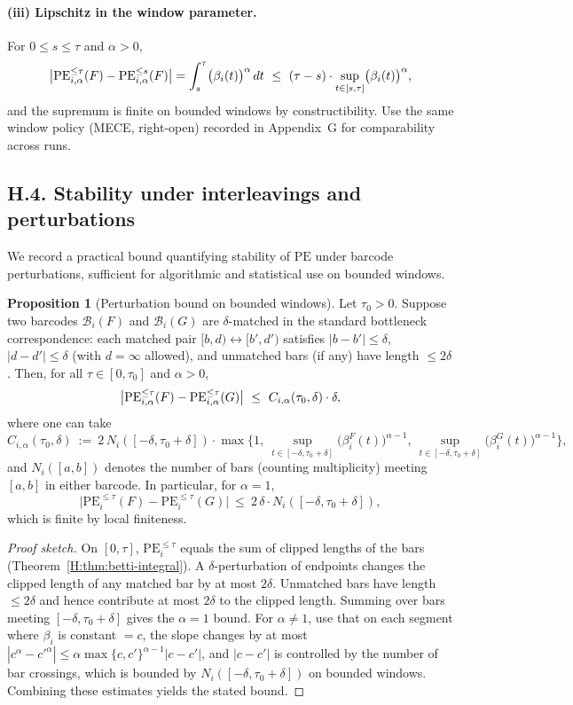 \documentclass[11pt]{article}
\numberwithin{equation}{section}
\theoremstyle{plain}
\theoremstyle{definition}
\theoremstyle{remark}
\theoremstyle{plain}
\theoremstyle{definition}
\numberwithin{equation}{section}
\newtheorem{proposition}[theorem]{Proposition}
\theoremstyle{definition}
\numberwithin{equation}{section}
\theoremstyle{plain}
\theoremstyle{definition}
\theoremstyle{remark}
\providecommand{\n}{\unskip\space}
\begin{document}
\paragraph{(iii) Lipschitz in the window parameter.}
For $0\le s\le \tau$ and $\alpha>0$,
\[
\bigl|\mathrm{PE}_{i,\alpha}^{\le \tau}(F)-\mathrm{PE}_{i,\alpha}^{\le s}(F)\bigr|\n=\int_{s}^{\tau}\bigl(\beta_i(t)\bigr)^{\alpha}\,dt\n\ \le\ (\tau-s)\cdot \sup_{t\in[s,\tau]}\bigl(\beta_i(t)\bigr)^{\alpha},
\]
and the supremum is finite on bounded windows by constructibility. Use the same window policy (MECE, right-open) recorded in Appendix~G for comparability across runs.

\subsection*{H.4. Stability under interleavings and perturbations}
We record a practical bound quantifying stability of $\mathrm{PE}$ under barcode perturbations, sufficient for algorithmic and statistical use on bounded windows.

\begin{proposition}[Perturbation bound on bounded windows]\label{H:prop:bounded-stability}
Let $\tau_0>0$. Suppose two barcodes $\mathcal{B}_i(F)$ and $\mathcal{B}_i(G)$ are $\delta$-matched in the standard bottleneck correspondence: each matched pair $[b,d)\leftrightarrow[b',d')$ satisfies $|b-b'|\le\delta$, $|d-d'|\le\delta$ (with $d=\infty$ allowed), and unmatched bars (if any) have length $\le 2\delta$. Then, for all $\tau\in[0,\tau_0]$ and $\alpha>0$,
\[
\bigl|\mathrm{PE}_{i,\alpha}^{\le \tau}(F)-\mathrm{PE}_{i,\alpha}^{\le \tau}(G)\bigr|\n\ \le\ C_{i,\alpha}(\tau_0,\delta)\cdot \delta,
\]
where one can take
\[
C_{i,\alpha}(\tau_0,\delta)\ :=\ 2\,N_{i}([-\delta,\tau_0+\delta])\cdot \max\bigl\{1,\ \sup_{t\in[-\delta,\tau_0+\delta]}\bigl(\beta_i^F(t)\bigr)^{\alpha-1},\ \sup_{t\in[-\delta,\tau_0+\delta]}\bigl(\beta_i^G(t)\bigr)^{\alpha-1}\bigr\},
\]
and $N_{i}([a,b])$ denotes the number of bars (counting multiplicity) meeting $[a,b]$ in either barcode. In particular, for $\alpha=1$,
\[
\bigl|\mathrm{PE}_{i}^{\le \tau}(F)-\mathrm{PE}_{i}^{\le \tau}(G)\bigr|\ \le\ 2\,\delta\cdot N_{i}([-\delta,\tau_0+\delta]),
\]
which is finite by local finiteness.
\end{proposition}

\begin{proof}[Proof sketch]
On $[0,\tau]$, $\mathrm{PE}_i^{\le \tau}$ equals the sum of clipped lengths of the bars (Theorem~\ref{H:thm:betti-integral}). A $\delta$-perturbation of endpoints changes the clipped length of any matched bar by at most $2\delta$. Unmatched bars have length $\le 2\delta$ and hence contribute at most $2\delta$ to the clipped length. Summing over bars meeting $[-\delta,\tau_0+\delta]$ gives the $\alpha=1$ bound. For $\alpha\neq 1$, use that on each segment where $\beta_i$ is constant $=c$, the slope changes by at most $|c^\alpha-{c'}^\alpha|\le \alpha\max\{c,c'\}^{\alpha-1}|c-c'|$, and $|c-c'|$ is controlled by the number of bar crossings, which is bounded by $N_i([-\delta,\tau_0+\delta])$ on bounded windows. Combining these estimates yields the stated bound.
\end{proof}
\end{document}
